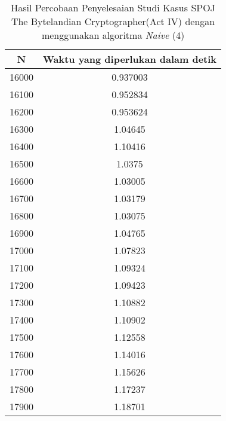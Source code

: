\begin{table}[H]
\centering
\begin{tabular}{|c|c|}\hline
N&Waktu yang diperlukan dalam detik\\ \hline
16000&0.937003\\ \hline
16100&0.952834\\ \hline
16200&0.953624\\ \hline
16300&1.04645\\ \hline
16400&1.10416\\ \hline
16500&1.0375\\ \hline
16600&1.03005\\ \hline
16700&1.03179\\ \hline
16800&1.03075\\ \hline
16900&1.04765\\ \hline
17000&1.07823\\ \hline
17100&1.09324\\ \hline
17200&1.09423\\ \hline
17300&1.10882\\ \hline
17400&1.10902\\ \hline
17500&1.12558\\ \hline
17600&1.14016\\ \hline
17700&1.15626\\ \hline
17800&1.17237\\ \hline
17900&1.18701\\ \hline
\end{tabular}
\caption {Hasil Percobaan Penyelesaian Studi Kasus SPOJ The Bytelandian Cryptographer(Act IV) dengan menggunakan algoritma \textit{Naive} (4)}
\label{tab1:1res8}
\end{table}
